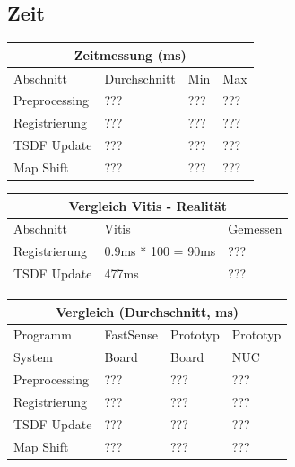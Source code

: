 \documentclass{beamer}
\begin{document}
\subsection{Zeit}
\begin{frame}{\subsecname}
\centering
\begin{tabular}{ |p{3cm}||p{2cm}|p{2cm}|p{2cm}|  }
 \hline
 \multicolumn{4}{|c|}{Zeitmessung (ms)} \\
 \hline
 Abschnitt      & Durchschnitt & Min & Max\\
 \hline
 Preprocessing  &          ??? & ??? & ??? \\
 Registrierung  &          ??? & ??? & ??? \\
 TSDF Update    &          ??? & ??? & ??? \\
 Map Shift      &          ??? & ??? & ??? \\
 \hline
\end{tabular}
\end{frame}

\begin{frame}
\centering
\begin{tabular}{ |l||l|l|  }
 \hline
 \multicolumn{3}{|c|}{Vergleich Vitis - Realität} \\
 \hline
 Abschnitt      & Vitis & Gemessen\\
 \hline
 Registrierung  & 0.9ms * 100 = 90ms & ??? \\
 TSDF Update    & 477ms & ??? \\
 \hline
\end{tabular}
\end{frame}

\begin{frame}{\subsecname}
\centering
\begin{tabular}{ |p{3cm}||p{2cm}|p{2cm}|p{2cm}|  }
 \hline
 \multicolumn{4}{|c|}{Vergleich (Durchschnitt, ms)} \\
 \hline
 Programm       & FastSense & Prototyp & Prototyp \\
 \hline
 System         &     Board &    Board &      NUC \\
 \hline
 Preprocessing  &       ??? &      ??? &      ??? \\
 Registrierung  &       ??? &      ??? &      ??? \\
 TSDF Update    &       ??? &      ??? &      ??? \\
 Map Shift      &       ??? &      ??? &      ??? \\
\hline
\end{tabular}
\end{frame}
\end{document}
